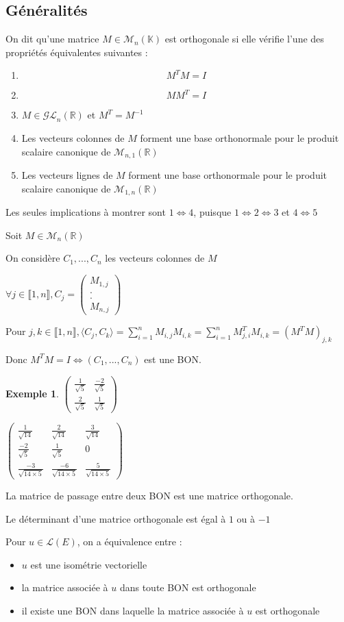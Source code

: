 \documentclass[a4paper,12pt]{book}
\newcommand{\Def}[2]{\begin{tcolorbox}[sharp corners, colback=white,colframe=blue!90!black!75, title=Définition : #1]#2\end{tcolorbox}}
\newcommand{\Prop}[2]{\begin{tcolorbox}[sharp corners, colback=white,colframe=red!90!black!75, title=Proposition : #1]#2\end{tcolorbox}}
\newcommand{\Pre}[1]{\begin{tcolorbox}[sharp corners, colback=white,colframe=green!60!green!30!black!75, title=Preuve]#1\end{tcolorbox}}
\newtheorem{Exe}{Exemple}[section]
\def\R{\mathbb{R}}
\def\K{\mathbb{K}}
\begin{document}
\subsection{Généralités}
\Def{}{On dit qu'une matrice $M\in\mathcal{M}_n(\K)$ est orthogonale si elle vérifie l'une des propriétés équivalentes suivantes :\begin{enumerate}
\item $$M^TM = I$$
\item $$MM^T = I$$
\item $M\in\mathcal{GL}_n(\R)$ et $M^T=M^{-1}$
\item Les vecteurs colonnes de $M$ forment une base orthonormale pour le produit scalaire canonique de $\mathcal{M}_{n,1}(\R)$
\item Les vecteurs lignes de $M$ forment une base orthonormale pour le produit scalaire canonique de $\mathcal{M}_{1,n}(\R)$
\end{enumerate}}
\Pre{Les seules implications à montrer sont $1\Leftrightarrow 4$, puisque $1\Leftrightarrow 2\Leftrightarrow 3$ et $4\Leftrightarrow 5$
\par Soit $M\in\mathcal{M}_n(\R)$
\par On considère $C_1,..., C_n$ les vecteurs colonnes de $M$
\par $\forall j\in\llbracket 1,n\rrbracket, C_j = \begin{pmatrix}M_{1,j}\\ .\\.\\ M_{n, j}\end{pmatrix}$
\par Pour $j, k\in\llbracket 1, n\rrbracket, \langle C_j, C_k\rangle = \sum\limits_{i=1}^nM_{i,j}M_{i,k} = \sum\limits_{i=1}^nM^T_{j,i}M_{i,k} = (M^TM)_{j,k}$
\par Donc $M^TM=I\Leftrightarrow (C_1,..., C_n)$ est une BON.}
\begin{Exe}
$\begin{pmatrix}\frac{1}{\sqrt{5}} & \frac{-2}{\sqrt{5}} \\ \frac{2}{\sqrt{5}} & \frac{1}{\sqrt{5}}\end{pmatrix}$
\par $\begin{pmatrix} \frac{1}{\sqrt{14}}&\frac{2}{\sqrt{14}} &\frac{3}{\sqrt{14}} \\\frac{-2}{\sqrt{5}} &\frac{1}{\sqrt{5}} & 0 \\ \frac{-3}{\sqrt{14\times 5}} &\frac{-6}{\sqrt{14\times 5}} &\frac{5}{\sqrt{14\times 5}} \end{pmatrix}$
\end{Exe}
\Prop{}{La matrice de passage entre deux BON est une matrice orthogonale.}
\Prop{}{Le déterminant d'une matrice orthogonale est égal à $1$ ou à $-1$}
\Def{}{Pour $u\in\mathcal{L}(E)$, on a équivalence entre :\begin{itemize}
\item $u$ est une isométrie vectorielle
\item la matrice associée à $u$ dans toute BON est orthogonale
\item il existe une BON dans laquelle la matrice associée à $u$ est orthogonale
\end{itemize}}
\end{document}
